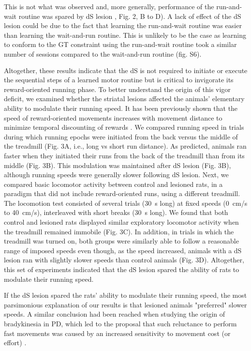 This is not what was observed and, more generally, performance of the run-and-wait routine was spared by dS lesion , Fig. 2, B to D).
A lack of effect of the dS lesion could be due to the fact that learning the run-and-wait routine was easier than learning the wait-and-run routine. 
This is unlikely to be the case as learning to conform to the GT constraint using the run-and-wait routine took a similar number of sessions compared to the wait-and-run routine (fig. S6).
\par
Altogether, these results indicate that the dS is not required to initiate or execute the sequential steps of a learned motor routine but is critical to invigorate its reward-oriented running phase.
To better understand the origin of this vigor deficit, we examined whether the striatal lesions affected the animals' elementary ability to modulate their running speed.
It has been previously shown that the speed of reward-oriented movements increases with movement distance to minimize temporal discounting of rewards \cite{Shadmehr2010JN, Reppert2018JNPhys}.
We compared running speed in trials during which running epochs were initiated from the back versus the middle of the treadmill (Fig. 3A, i.e., long vs short run distance).
As predicted, animals ran faster when they initiated their runs from the back of the treadmill than from its middle (Fig. 3B). This modulation was maintained after dS lesion (Fig. 3B), although running speeds were generally slower following dS lesion.
Next, we compared basic locomotor activity between control and lesioned rats, in a paradigm that did not include reward-oriented runs, using a different treadmill.
The locomotion test consisted of several trials (30~s long) at fixed speeds (0~cm/s to 40~cm/s), interleaved with short breaks (30~s long).
We found that both control and lesioned rats displayed similar exploratory locomotor activity when the treadmill remained immobile (Fig. 3C).
In addition, in trials in which the treadmill was turned on, both groups were similarly able to follow a reasonable range of imposed speeds even though, as the speed increased, animals with a dS lesion ran with slightly slower speeds than control animals (Fig. 3D).
Altogether, this set of experiments indicated that the dS lesion spared the ability of rats to modulate their running speed.
\par
If the dS lesion spared the rats' ability to modulate their running speed, the most parsimonious explanation of our results is that lesioned animals "preferred" slower speeds.
A similar conclusion had been reached when studying the origin of bradykinesia in PD, which led to the proposal that such reluctance to perform fast movements was caused by an increased sensitivity to movement cost (or effort) \cite{Mazzoni2007JN, Baraduc2013JN}.
